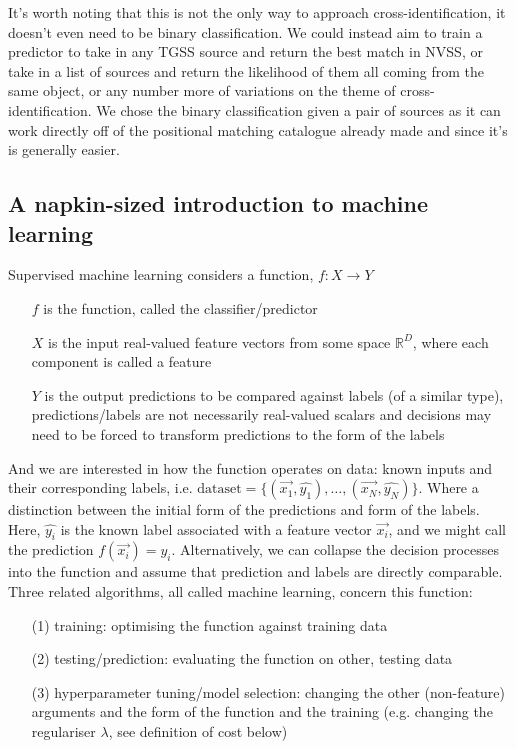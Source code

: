 \documentclass[12pt,a4paper]{article}
\begin{document}
It's worth noting that this is not the only way to approach cross-identification, it doesn't even need to be binary classification. We could instead aim to train a predictor to take in any TGSS source and return the best match in NVSS, or take in a list of sources and return the likelihood of them all coming from the same object, or any number more of variations on the theme of cross-identification. We chose the binary classification given a pair of sources as it can work directly off of the positional matching catalogue already made and since it's is generally easier.

\subsection{A napkin-sized introduction to machine learning}
\label{sec:napkin_intro_to_ml}
Supervised machine learning considers a function, $f: X \rightarrow Y$
\begin{itemize}
    \item[$f$] is the function, called the classifier/predictor
    \item[$X$] is the input real-valued feature vectors from some space $\mathbb{R}^D$, where each component is called a feature
    \item[$Y$] is the output predictions to be compared against labels (of a similar type), predictions/labels are not necessarily real-valued scalars and decisions may need to be forced to transform predictions to the form of the labels
\end{itemize}
And we are interested in how the function operates on data: known inputs and their corresponding labels, i.e. $\text{dataset} = \{(\vec{x_1},\hat{y_1}), \ldots, (\vec{x_N},\hat{y_N})\}$. Where a distinction between the initial form of the predictions and form of the labels. Here, $\hat{y_i}$ is the known label associated with a feature vector $\vec{x_i}$, and we might call the prediction $f(\vec{x_i}) = y_i$. Alternatively, we can collapse the decision processes into the function and assume that prediction and labels are directly comparable.\\

Three related algorithms, all called machine learning, concern this function:
\begin{itemize}
    \item[(1)] training: optimising the function against training data
    \item[(2)] testing/prediction: evaluating the function on other, testing data
    \item[(3)] hyperparameter tuning/model selection: changing the other (non-feature) arguments and the form of the function and the training (e.g. changing the regulariser $\lambda$, see definition of cost below)
\end{itemize}
\end{document}
